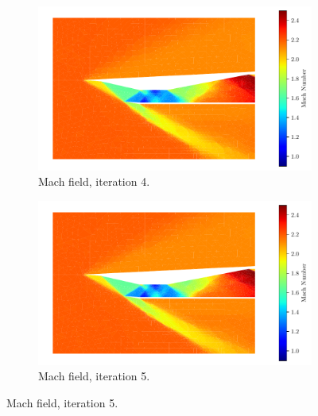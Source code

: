 \begin{figure}[h!]
    \begin{subfigure}[h]{0.49\linewidth}
        \centering
        \includegraphics[width=\linewidth]{rep/q4/Machfield4.pdf}
        \caption{Mach field, iteration 4.}
    \end{subfigure}
    \begin{subfigure}[h]{0.49\linewidth}
        \centering
        \includegraphics[width=\linewidth]{rep/q4/Machfield5.pdf}
        \caption{Mach field, iteration 5.}
    \end{subfigure}
\end{figure}


